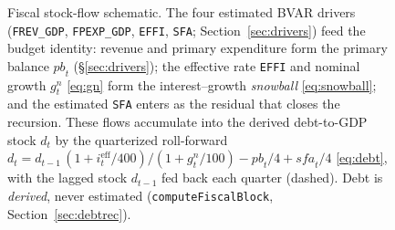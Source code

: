 \documentclass[11pt]{article}
\theoremstyle{plain}
\theoremstyle{remark}
\begin{document}
\begin{figure}[!ht]
\caption{Fiscal stock-flow schematic. The four estimated BVAR drivers
(\texttt{FREV\_GDP}, \texttt{FPEXP\_GDP}, \texttt{EFFI}, \texttt{SFA};
Section~\ref{sec:drivers}) feed the budget identity: revenue and
primary expenditure form the primary balance $\mathit{pb}_t$
(\S\ref{sec:drivers}); the effective rate \texttt{EFFI} and nominal growth
$g^{n}_t$ \eqref{eq:gn} form the interest--growth \emph{snowball}
\eqref{eq:snowball}; and the estimated \texttt{SFA} enters as the
residual that closes the recursion. These flows accumulate into the derived
debt-to-GDP stock $d_t$ by the quarterized roll-forward
$d_t = d_{t-1}\,(1{+}i^{\text{eff}}_t/400)/(1{+}g^{n}_t/100)
- \mathit{pb}_t/4 + \mathit{sfa}_t/4$ \eqref{eq:debt}, with the lagged
stock $d_{t-1}$ fed back each quarter (dashed). Debt is \emph{derived}, never
estimated (\texttt{computeFiscalBlock}, Section~\ref{sec:debtrec}).}
\label{fig:fiscal}
\end{figure}
\end{document}
